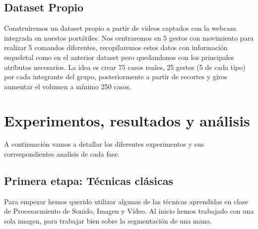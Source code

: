 \documentclass[10pt,a4paper,twocolumn,twoside]{article}
\begin{document}
\subsection{Dataset Propio}
Construiremos un dataset propio a partir de videos captados con la webcam integrada en nuestos portátiles. Nos centraremos en 5 gestos con movimiento para realizar 5 comandos diferentes, recopilaremos estos datos con información esqueletal como en el anterior dataset pero quedandonos con los principales atributos necesarios. 
La idea es crear 75 casos reales, 25 gestos (5 de cada tipo) por cada integrante del grupo, posteriormente a partir de recortes y giros aumentar el volumen a mínimo 250 casos. 


\section{Experimentos, resultados y análisis}

A continuación vamos a detallar los diferentes experimentos y sus correspondientes analisis de cada fase.

\subsection{Primera etapa: Técnicas clásicas}

Para empezar hemos querido utilizar algunas de las técnicas aprendidas en clase de Procesacmiento de Sonido, Imagen y Vídeo. 
Al inicio hemos trabajado con una sola imagen, para trabajar bien sobre la segmentación de una mano.
\end{document}
